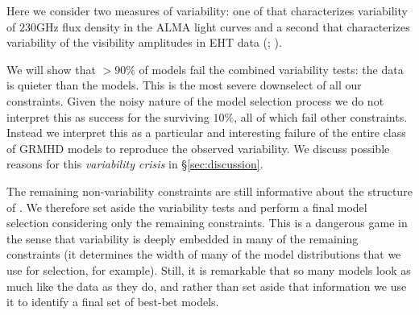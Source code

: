 Here we consider two measures of variability: one of that characterizes variability of $230$GHz flux density in the ALMA light curves \citep{Wielgus2022} and a second that characterizes variability of the visibility amplitudes in EHT data (; \citealt{NoiseModeling}).

We will show that $> 90\%$ of models fail the combined variability tests: the data is quieter than the models.  This is the most severe downselect of all our constraints. Given the noisy nature of the model selection process we do not interpret this as success for the surviving $10\%$, all of which fail other constraints.  Instead we interpret this as a particular and interesting failure of the entire class of GRMHD models to reproduce the observed variability.  We discuss possible reasons for this {\em variability crisis} in \S \ref{sec:discussion}. 

The remaining non-variability constraints are still informative about the structure of \sgra.  We therefore set aside the variability tests and perform a final model selection considering only the remaining constraints.  This is a dangerous game in the sense that variability is deeply embedded in many of the remaining constraints (it determines the width of many of the model distributions that we use for selection, for example).  Still, it is remarkable that so many models look as much like the data as they do, and rather than set aside that information we use it to identify a final set of best-bet models.   


